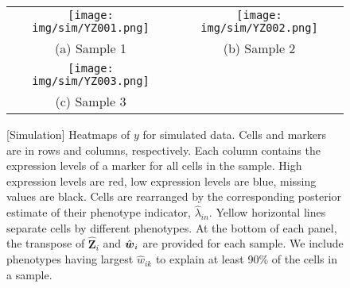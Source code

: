 \documentclass[12pt,]{article}
\def\beginmyfig{\begin{figure}[H]\center}
\def\endmyfig{\end{figure}}
\def\Z{\bm{Z}}
\newcommand{\true}{{\mbox{\tiny TR}}}
\newcommand{\bZ}{\mbox{\boldmath $Z$}}
\newcommand{\bw}{\mbox{\boldmath $w$}}
\def\beginmyfig{\begin{figure}[H]\center}
\def\endmyfig{\end{figure}}
\begin{document}
\begin{figure}%
  \begin{center}
  \begin{tabular}{cc}
  \texttt{[image: img/sim/YZ001.png]}&
  \texttt{[image: img/sim/YZ002.png]}\\
  {\small (a) Sample 1} & {\small(b) Sample 2} \\
  \texttt{[image: img/sim/YZ003.png]}&\\
  {\small (c) Sample 3} & \\
  \end{tabular}
  \end{center}
  \vspace{-0.05in}
  \caption{\small[Simulation]  Heatmaps of $y$ for simulated data. Cells and
    markers are in rows and columns, respectively. Each column contains the
    expression levels of a marker for all cells in the sample. High expression
    levels are red, low expression levels are blue, missing values are black.
    Cells are rearranged by the corresponding posterior estimate of their
    phenotype indicator, $\hat{\lambda}_{in}$.  Yellow horizontal lines separate
    cells by different phenotypes.  At the bottom of each panel, the
    transpose of $\hat{\Z}_i$ and $\hat{\bw}_i$ are provided for each sample.
    We include phenotypes having largest $\hat{w}_{ik}$ to explain at least 90\%
    of the cells in a sample.}
\label{fig:sim-post-Z}
\end{figure}






\end{document}
